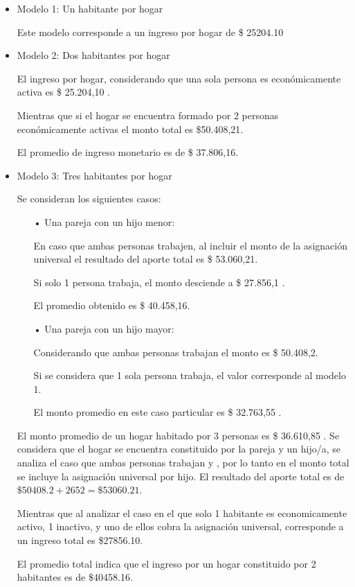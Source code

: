 \begin{itemize}
\item Modelo 1: Un habitante por hogar

Este modelo corresponde a un ingreso por hogar de \$ 25204.10

\item Modelo 2: Dos habitantes por hogar

El ingreso por hogar, considerando que una sola persona es económicamente activa es \$ 25.204,10 .

Mientras que si el hogar se encuentra formado por 2 personas económicamente activas el monto total es \$50.408,21. 

El promedio de ingreso monetario es de \$ 37.806,16.

\item Modelo 3: Tres habitantes por hogar

Se consideran los siguientes casos:
\begin{enumerate}
\item[•]Una pareja con un hijo menor:

En caso que ambas personas trabajen, al incluir el monto de la asignación universal el resultado del aporte total es \$ 53.060,21. 

Si solo 1 persona trabaja, el monto desciende a  \$ 27.856,1 .

El promedio obtenido es  \$ 40.458,16.

\item[•]Una pareja con un hijo mayor:

Considerando que ambas personas trabajan el monto es  \$ 50.408,2.

Si se considera que 1 sola persona trabaja, el valor corresponde al modelo 1.

El monto promedio en este caso particular es  \$ 32.763,55 .
\end{enumerate}
El monto promedio de un hogar habitado por 3 personas es \$ 36.610,85 .
Se considera que el hogar se encuentra constituido por la pareja y un hijo/a, se analiza el caso que ambas personas trabajan y , por lo tanto en el  monto total se incluye la asignación universal por hijo. El resultado del aporte total es de $ \$50408.2 + 2652 = \$ 53060.21$. 

Mientras que al analizar el caso en el que solo 1 habitante es economicamente activo, 1 inactivo, y uno de ellos cobra la asignación universal, corresponde a un ingreso total es \$27856.10.

El promedio total indica que el ingreso por un hogar constituido por 2 habitantes es de \$40458.16.
 

\end{itemize}
